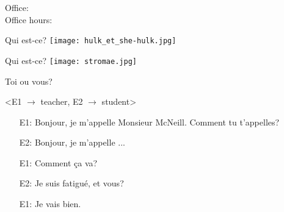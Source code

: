 \documentclass{beamer}
\subtitle[Présentons-nous]{Présentons-nous}
\begin{document}
  \begin{frame}
    \titlepage
    \tiny{Office: \\
          Office hours: }
  \end{frame}

  \begin{frame}{Qui est-ce?}
    \centering
    \texttt{[image: hulk\_et\_she-hulk.jpg]}


  \end{frame}

  \begin{frame}{Qui est-ce?}
    \centering
    \texttt{[image: stromae.jpg]}


  \end{frame}

  \begin{frame}{Toi ou vous?}

    <E1 $\to$ teacher, E2 $\to$ student>
    \begin{itemize}
      \item[E1:] Bonjour, je m'appelle Monsieur McNeill. Comment tu t'appelles?
      \item[E2:] Bonjour, je m'appelle ...
      \item[E1:] Comment ça va?
      \item[E2:] Je suis fatigué, et vous?
      \item[E1:] Je vais bien.
    \end{itemize}
  \end{frame}
\end{document}
